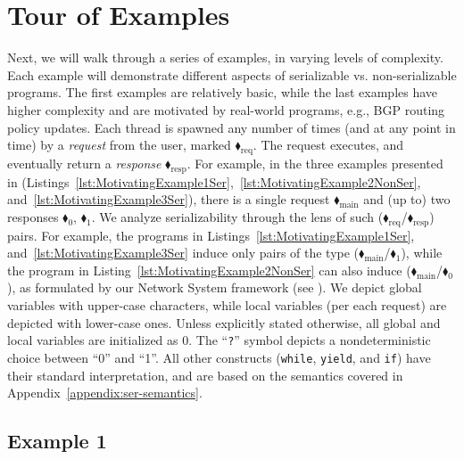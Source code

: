 \appendix


\section{Tour of Examples}
\label{appendix:tour}


Next, we will walk through a series of examples, in varying levels of complexity. Each example will demonstrate different aspects of serializable vs. non-serializable programs.
%
The first examples are relatively basic, while the last examples have higher complexity and are motivated by real-world programs, e.g., BGP routing policy updates.
%
Each thread is spawned any number of times (and at any point in time) by a \textit{request} from the user, marked {\color{ForestGreen}$\blacklozenge_\text{req}$}. The request executes, and eventually return a \textit{response}  {\color{red}$\blacklozenge_\text{resp}$}.
%
For example, in the three examples presented in  (Listings~\ref{lst:MotivatingExample1Ser},~\ref{lst:MotivatingExample2NonSer}, and~\ref{lst:MotivatingExample3Ser}), there is a single request {\color{ForestGreen}$\blacklozenge_\text{main}$} and (up to) two responses {\color{red}$\blacklozenge_0$}, {\color{red}$\blacklozenge_1$}.
% 
We analyze serializability through the lens of such ({\color{ForestGreen}$\blacklozenge_\text{req}$}/{\color{red}$\blacklozenge_\text{resp}$}) pairs. For example, the programs in Listings~\ref{lst:MotivatingExample1Ser}, and~\ref{lst:MotivatingExample3Ser} induce only pairs of the type ({\color{ForestGreen}$\blacklozenge_\text{main}$}/{\color{red}$\blacklozenge_1$}), while the program in Listing~\ref{lst:MotivatingExample2NonSer} can also induce ({\color{ForestGreen}$\blacklozenge_\text{main}$}/{\color{red}$\blacklozenge_0$}), as formulated by our Network System framework (see ). 
%
We depict global variables with upper-case characters, while local variables (per each request) are depicted with lower-case ones.
%
Unless explicitly stated otherwise, all global and local variables are initialized as 0.
%
The ``\texttt{?}'' symbol depicts a nondeterministic choice between ``0'' and ``1''. All other constructs (\texttt{while}, \texttt{yield}, and \texttt{if}) have their standard interpretation, and are based on the \toolname{} semantics covered in Appendix~\ref{appendix:ser-semantics}.

\subsection{Example 1}

